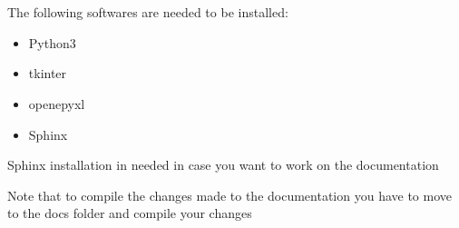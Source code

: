 \documentclass[letterpaper,10pt,english]{sphinxmanual}
\begin{document}


\section{}
\label{\detokenize{developer:developer-manual}}\label{\detokenize{developer::doc}}

\subsection{}
\label{\detokenize{developer:software-requirements}}
The following softwares are needed to be installed:
\begin{itemize}
\item {} 
Python3

\end{itemize}
\begin{itemize}
\item {} 
tkinter

\item {} 
openepyxl

\end{itemize}
\begin{itemize}
\item {} 
Sphinx

\end{itemize}

\begin{sphinxVerbatim}[commandchars=\\\{\}]
   
   
  
\end{sphinxVerbatim}

Sphinx installation in needed in case you want to work on the documentation

\begin{sphinxVerbatim}[commandchars=\\\{\}]
  
\end{sphinxVerbatim}

Note that to compile the changes made to the documentation you have to move to the docs folder and compile your changes
\end{document}
